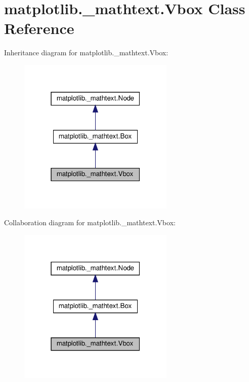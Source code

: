 \hypertarget{classmatplotlib_1_1__mathtext_1_1Vbox}{}\section{matplotlib.\+\_\+mathtext.\+Vbox Class Reference}
\label{classmatplotlib_1_1__mathtext_1_1Vbox}


Inheritance diagram for matplotlib.\+\_\+mathtext.\+Vbox\+:
\nopagebreak
\begin{figure}[H]
\begin{center}
\leavevmode
\includegraphics[width=211pt]{classmatplotlib_1_1__mathtext_1_1Vbox__inherit__graph}
\end{center}
\end{figure}


Collaboration diagram for matplotlib.\+\_\+mathtext.\+Vbox\+:
\nopagebreak
\begin{figure}[H]
\begin{center}
\leavevmode
\includegraphics[width=211pt]{classmatplotlib_1_1__mathtext_1_1Vbox__coll__graph}
\end{center}
\end{figure}
